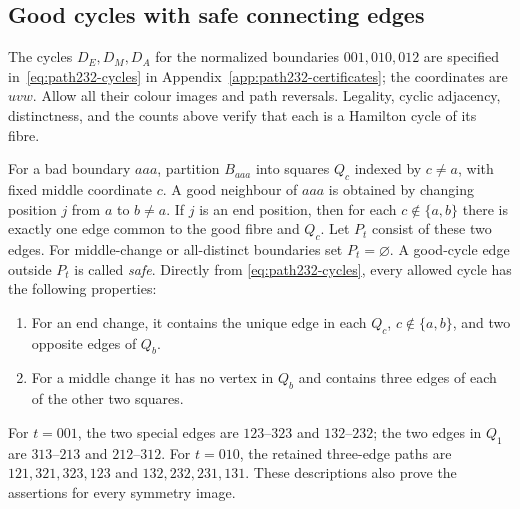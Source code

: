 \documentclass[11pt]{article}
\theoremstyle{remark}
\numberwithin{equation}{section}
\numberwithin{table}{section}
\begin{document}
\subsection{Good cycles with safe connecting edges}
The cycles $D_E,D_M,D_A$ for the normalized boundaries $001,010,012$
are specified in~\eqref{eq:path232-cycles} in
Appendix~\ref{app:path232-certificates}; the coordinates are $uvw$.
Allow all their colour images and path reversals. Legality, cyclic adjacency, distinctness, and the counts
above verify that each is a Hamilton cycle of its fibre.

For a bad boundary $aaa$, partition $B_{aaa}$ into squares $Q_c$ indexed
by $c\ne a$, with fixed middle coordinate $c$. A good neighbour of
$aaa$ is obtained by changing position $j$ from $a$ to $b\ne a$.
If $j$ is an end position, then for each $c\notin\{a,b\}$ there is
exactly one edge common to the good fibre and $Q_c$. Let $P_t$ consist
of these two edges. For middle-change or all-distinct boundaries set
$P_t=\varnothing$. A good-cycle edge outside $P_t$ is called \emph{safe}.
Directly from \eqref{eq:path232-cycles}, every allowed cycle has the following properties:
\begin{enumerate}
\item For an end change, it contains the unique edge in each
      $Q_c$, $c\notin\{a,b\}$, and two opposite edges of $Q_b$.
\item For a middle change it has no vertex in $Q_b$ and contains
      three edges of each of the other two squares.
\end{enumerate}
For $t=001$, the two special edges are $123$--$323$ and $132$--$232$;
the two edges in $Q_1$ are $313$--$213$ and $212$--$312$.
For $t=010$, the retained three-edge paths are
$121,321,323,123$ and $132,232,231,131$.
These descriptions also prove the assertions for every symmetry image.
\end{document}
